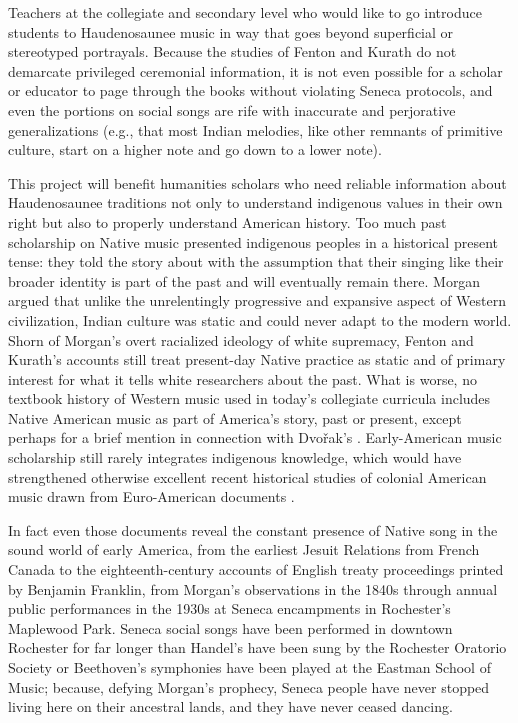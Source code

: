 \documentclass{neh}
\begin{document}
Teachers at the collegiate and secondary level who would like to go introduce
students to Haudenosaunee music in way that goes beyond superficial or
stereotyped portrayals.
Because the studies of Fenton and Kurath do not demarcate privileged
ceremonial information, it is not even possible for a scholar or educator to
page through the books without violating Seneca protocols, and even the
portions on social songs are rife with inaccurate and perjorative
generalizations (e.g., that most Indian melodies, like other remnants of
primitive culture, start on a higher note and go down to a lower note).

This project will benefit humanities scholars who need reliable information
about Haudenosaunee traditions not only to understand indigenous values in
their own right but also to properly understand American history.
Too much past scholarship on Native music presented indigenous peoples in a
historical present tense: they told the story about 
with the assumption that their singing like their broader identity is part
of the past and will eventually remain there.
Morgan argued that unlike the unrelentingly progressive and expansive aspect
of Western civilization, Indian culture was static and could never adapt to
the modern world. 
Shorn of Morgan's overt racialized ideology of white supremacy, Fenton and
Kurath's accounts still treat present-day Native practice as static and of
primary interest for what it tells white researchers about the past.
What is worse, no textbook history of Western music used in today's collegiate
curricula includes Native American music as part of America's story, past or
present, except perhaps for a brief mention in connection with Dvo\v{r}ak's
.
Early-American music scholarship still rarely integrates indigenous knowledge,
which would have strengthened otherwise excellent recent historical studies of
colonial American music drawn from Euro-American documents
\Autocites{Goodman:IndianPsalmody}{Eyerly:Moravian}.

In fact even those documents reveal the constant presence of Native song in
the sound world of early America, from the earliest Jesuit Relations from
French Canada to the eighteenth-century accounts of English treaty proceedings
printed by Benjamin Franklin, from Morgan's observations in the 1840s through
annual public performances in the 1930s at Seneca encampments in Rochester's
Maplewood Park.
Seneca social songs have been performed in downtown Rochester for far longer
than Handel's  have been sung by the Rochester Oratorio
Society or Beethoven's symphonies have been played at the Eastman School of
Music; because, defying Morgan's prophecy, Seneca people have never stopped
living here on their ancestral lands, and they have never ceased dancing.
\end{document}
